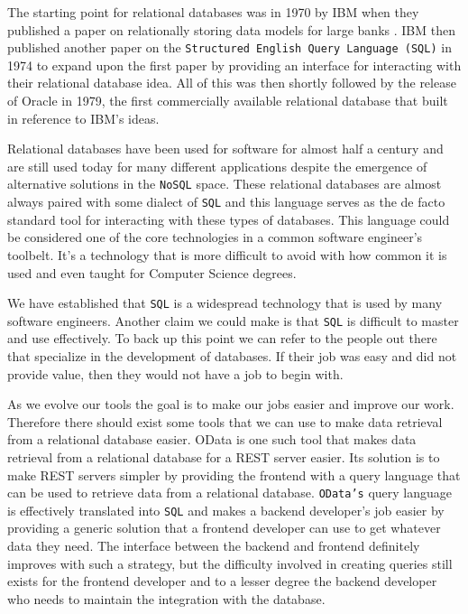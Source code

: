 \documentclass[11pt]{article}
\begin{document}
The starting point for relational databases was in 1970 by IBM when they published a paper on relationally storing data models for large banks \citep{rdbms}. IBM then published another paper on the \texttt{Structured English Query Language (SQL)} \citep{sql} in 1974 to expand upon the first paper by providing an interface for interacting with their relational database idea. All of this was then shortly followed by the release of Oracle in 1979, the first commercially available relational database that built in reference to IBM's ideas.

Relational databases have been used for software for almost half a century and are still used today for many different applications despite the emergence of alternative solutions in the \texttt{NoSQL} space. These relational databases are almost always paired with some dialect of \texttt{SQL} and this language serves as the de facto standard tool for interacting with these types of databases. This language could be considered one of the core technologies in a common software engineer's toolbelt. It's a technology that is more difficult to avoid with how common it is used and even taught for Computer Science degrees.

We have established that \texttt{SQL} is a widespread technology that is used by many software engineers. Another claim we could make is that \texttt{SQL} is difficult to master and use effectively. To back up this point we can refer to the people out there that specialize in the development of databases. If their job was easy and did not provide value, then they would not have a job to begin with.

As we evolve our tools the goal is to make our jobs easier and improve our work. Therefore there should exist some tools that we can use to make data retrieval from a relational database easier. OData \citep{odata} is one such tool that makes data retrieval from a relational database for a REST server easier. Its solution is to make REST servers simpler by providing the frontend with a query language that can be used to retrieve data from a relational database. \texttt{OData's} query language is effectively translated into \texttt{SQL} and makes a backend developer's job easier by providing a generic solution that a frontend developer can use to get whatever data they need. The interface between the backend and frontend definitely improves with such a strategy, but the difficulty involved in creating queries still exists for the frontend developer and to a lesser degree the backend developer who needs to maintain the integration with the database.
\end{document}
